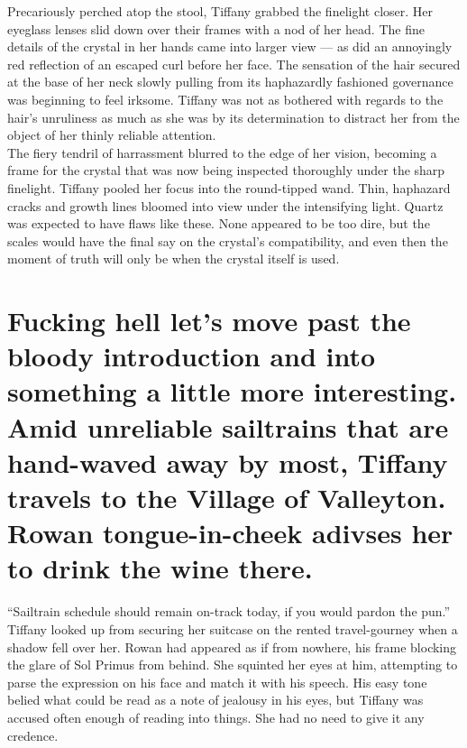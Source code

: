Precariously perched atop the stool, Tiffany grabbed the finelight closer.
Her eyeglass lenses slid down over their frames with a nod of her head.
The fine details of the crystal in her hands came into larger view --- as did an annoyingly red reflection of an escaped curl before her face.
The sensation of the hair secured at the base of her neck slowly pulling from its haphazardly fashioned governance was beginning to feel irksome.
Tiffany was not as bothered with regards to the hair's unruliness as much as she was by its determination to distract her from the object of her thinly reliable attention.\\

The fiery tendril of harrassment blurred to the edge of her vision, becoming a frame for the crystal that was now being inspected thoroughly under the sharp finelight.
Tiffany pooled her focus into the round-tipped wand.
Thin, haphazard cracks and growth lines bloomed into view under the intensifying light.
Quartz was expected to have flaws like these.
None appeared to be too dire, but the scales would have the final say on the crystal's compatibility, and even then the moment of truth will only be when the crystal itself is used.\\



\section{Fucking hell let's move past the bloody introduction and into something a little more interesting. 
Amid unreliable sailtrains that are hand-waved away by most, Tiffany travels to the Village of Valleyton.
Rowan tongue-in-cheek adivses her to drink the wine there.}

``Sailtrain schedule should remain on-track today, if you would pardon the pun.''\\

Tiffany looked up from securing her suitcase on the rented travel-gourney when a shadow fell over her.
Rowan had appeared as if from nowhere, his frame blocking the glare of Sol Primus from behind.
She squinted her eyes at him, attempting to parse the expression on his face and match it with his speech.
His easy tone belied what could be read as a note of jealousy in his eyes, but Tiffany was accused often enough of reading into things.
She had no need to give it any credence.\\

